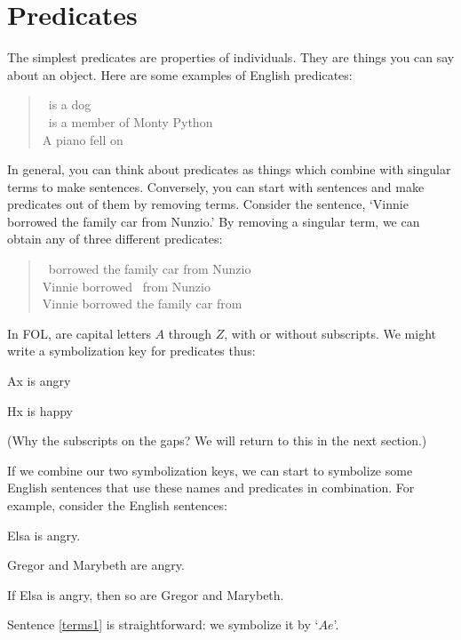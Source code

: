 \section{Predicates}
The simplest predicates are properties of individuals. They are things you can say about an object. Here are some examples of English predicates:
	\begin{quote}
		\blank\ is a dog\\
		\blank\ is a member of Monty Python\\
		A piano fell on \blank
	\end{quote}
In general, you can think about predicates as things which combine with singular terms to make sentences. Conversely, you can start with sentences and make predicates out of them by removing terms. Consider the sentence, `Vinnie borrowed the family car from Nunzio.' By removing a singular term, we can obtain any of three different predicates:
	\begin{quote}
		\blank\ borrowed the family car from Nunzio\\
		Vinnie borrowed \blank\ from Nunzio\\
		Vinnie borrowed the family car from \blank
	\end{quote}
In FOL,  are capital letters $A$ through $Z$, with or without subscripts. We might write a symbolization key for predicates thus:
	\begin{ekey}
		\item[Ax]  is angry
		\item[Hx]  is happy
	\end{ekey}
        (Why the subscripts on the gaps? We will return to this in the next section.)


If we combine our two symbolization keys, we can start to symbolize some English sentences that use these names and predicates in combination. For example, consider the English sentences:
	\begin{earg}
		\item[\ex{terms1}] Elsa is angry.
		\item[\ex{terms2a}] Gregor and Marybeth are angry.
		\item[\ex{terms2}] If Elsa is angry, then so are Gregor and Marybeth.
	\end{earg}
Sentence \ref{terms1} is straightforward: we symbolize it by `$Ae$'.

